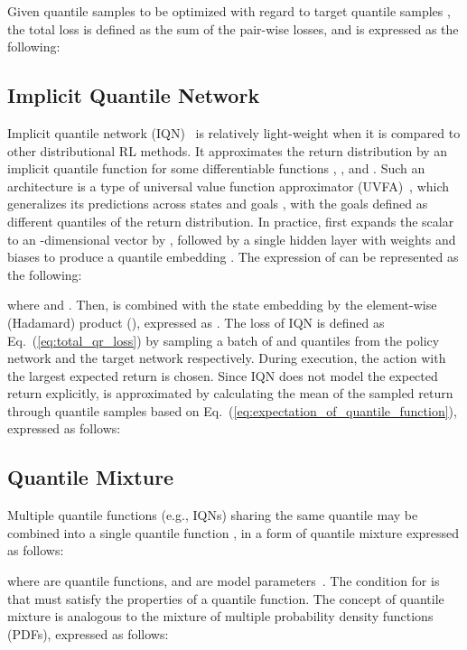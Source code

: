\documentclass{article}
\begin{document}
Given  quantile samples  to be optimized with regard to   target quantile samples , the total loss   is defined as the sum of the pair-wise losses, and is expressed as the following:




\subsection{Implicit Quantile Network}
\label{subsec:background_implicit_quantile_network}

Implicit quantile network (IQN)~\cite{Dabney2018IQN} is relatively light-weight when it is compared to other distributional RL methods. It approximates the return distribution  by an implicit quantile function  for some differentiable functions , , and . Such an architecture is a type of universal value function approximator (UVFA)~\cite{Schaul2015UVFA}, which generalizes its predictions across states  and goals , with the goals defined as different quantiles of the return distribution.
In practice,  first expands the scalar  to an -dimensional vector by , followed by a single hidden layer with weights  and biases  to produce a quantile embedding . The expression of  can be represented as the following:

where  and . Then,  is combined with the state embedding  by the element-wise (Hadamard) product (), expressed as . The loss of IQN is defined as Eq.~(\ref{eq:total_qr_loss}) by sampling a batch of  and  quantiles from the policy network and the target network respectively.
During execution, the action with the largest expected return  is chosen. Since IQN does not model the expected return explicitly,  is approximated by calculating the mean of the sampled return through  quantile samples  based on Eq.~(\ref{eq:expectation_of_quantile_function}), expressed as follows:




\subsection{Quantile Mixture}
\label{subsec:background_quantile_mixture}

Multiple quantile functions (e.g., IQNs) sharing the same quantile  may be combined into a single quantile function , in a form of quantile mixture expressed as follows:

where  are quantile functions, and  are model parameters~\cite{Karvanen2006QuantileMixture}. The condition for   is that  must satisfy the properties of a quantile function. The concept of quantile mixture is analogous to the mixture of multiple probability density functions (PDFs), expressed as follows:
\end{document}
